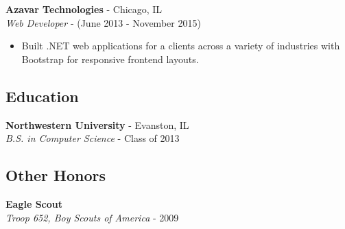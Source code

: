 \documentclass[12pt]{article}
\begin{document}
\begin{paracol}{2}
\noindent \textbf{Azavar Technologies} - Chicago, IL \\
\textit{Web Developer} - {\footnotesize(June 2013 - November 2015)}
\begin{itemize}[leftmargin=*]
    \setlength\itemsep{0.1em}
    \item {\footnotesize{Built .NET web applications for a clients across a variety of industries with Bootstrap for responsive frontend layouts.}} 
\end{itemize}

\subsection*{Education}
\textbf{Northwestern University} - Evanston, IL \\
\textit{B.S. in Computer Science} - {\footnotesize{Class of 2013}}

\subsection*{Other Honors}
\textbf{Eagle Scout} \\
\textit{Troop 652, Boy Scouts of America} - {\footnotesize{2009}}
    
\end{paracol}
\end{document}
